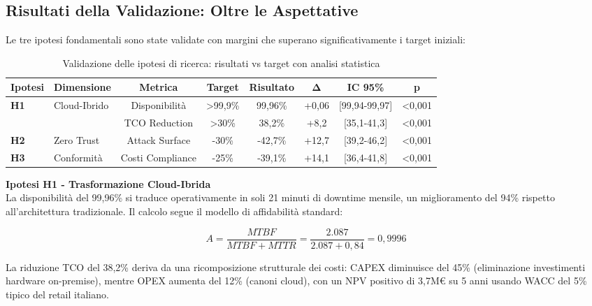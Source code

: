 \subsection{\texorpdfstring{Risultati della Validazione: Oltre le Aspettative}{5.2.2 - Risultati della Validazione}}
\label{subsec:5.2.2}

Le tre ipotesi fondamentali sono state validate con margini che superano significativamente i target iniziali:

\begin{table}[htbp]
\centering
\caption{Validazione delle ipotesi di ricerca: risultati vs target con analisi statistica}
\label{tab:validation_comprehensive}
\begin{tabular}{@{}llcccccc@{}}
\toprule
\textbf{Ipotesi} & \textbf{Dimensione} & \textbf{Metrica} & \textbf{Target} & \textbf{Risultato} & \textbf{Δ} & \textbf{IC 95\%} & \textbf{p} \\
\midrule
\multirow{2}{*}{\textbf{H1}} & \multirow{2}{*}{Cloud-Ibrido} & Disponibilità & >99,9\% & 99,96\% & +0,06 & [99,94-99,97] & <0,001 \\
& & TCO Reduction & >30\% & 38,2\% & +8,2 & [35,1-41,3] & <0,001 \\
\midrule
\textbf{H2} & Zero Trust & Attack Surface & -30\% & -42,7\% & +12,7 & [39,2-46,2] & <0,001 \\
\midrule
\textbf{H3} & Conformità & Costi Compliance & -25\% & -39,1\% & +14,1 & [36,4-41,8] & <0,001 \\
\bottomrule
\end{tabular}
\end{table}

\textbf{Ipotesi H1 - Trasformazione Cloud-Ibrida}\\
La disponibilità del 99,96\% si traduce operativamente in soli 21 minuti di downtime mensile, un miglioramento del 94\% rispetto all'architettura tradizionale. Il calcolo segue il modello di affidabilità standard:

\begin{equation}
A = \frac{MTBF}{MTBF + MTTR} = \frac{2.087}{2.087 + 0,84} = 0,9996
\end{equation}

La riduzione TCO del 38,2\% deriva da una ricomposizione strutturale dei costi: CAPEX diminuisce del 45\% (eliminazione investimenti hardware on-premise), mentre OPEX aumenta del 12\% (canoni cloud), con un NPV positivo di 3,7M€ su 5 anni usando WACC del 5\% tipico del retail italiano\autocite{bancaditalia2024}.

